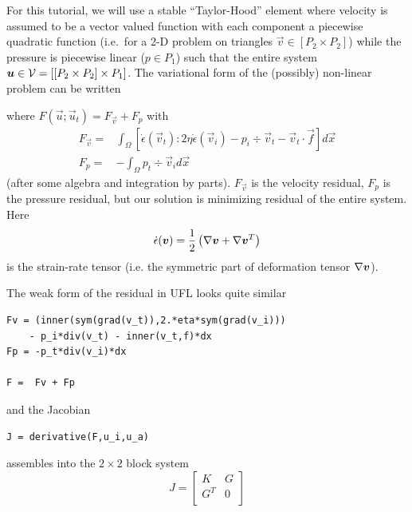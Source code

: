 For this tutorial, we will use a stable ``Taylor-Hood'' element where
velocity is assumed to be a vector valued function with each component
a piecewise quadratic function (i.e.\ for a 2-D problem on triangles
$\vec{v}\in [P_{2}\times P_{2}]$) while the pressure is piecewise
linear ($p\in P_{1}$) such that the entire system ${\mbox{\boldmath$u$}}\in \mathcal{V}
= [[P_{2}\times P_{2}]\times P_{1}]$.  The variational form of the
(possibly) non-linear problem can be written
\begin{quote}
\end{quote}
 where $F(\vec{u};\vec{u}_{t}) = F_{\vec{v}} + F_{p}$ with
\begin{align}
         F_{\vec{v}} =  & \int_\Omega \left[\dot{\epsilon}(\vec{v}_{t}):
             2\eta \dot{\epsilon}(\vec{v}_{i}) -
             p_{i}\div\vec{v}_t  - \vec{v}_{t} \cdot\vec{f} \right]d\vec{x}  \\
 F_{p} =& -\int_\Omega p_t\div\vec{v}_{i} d\vec{x}
\end{align}
(after some algebra and integration by parts). $F_{\vec{v}}$ is the
velocity residual, $F_{p}$ is the pressure residual, but our solution
is minimizing residual of the entire system.  Here
\begin{equation}
  \label{eq:19}
  \dot{\epsilon}({\mbox{\boldmath$v$}}) = \frac{1}{2}
  \left(
\nabla{\mbox{\boldmath$v$}} + \nabla{\mbox{\boldmath$v$}}^{T}
  \right)
\end{equation} is the strain-rate tensor (i.e. the symmetric part of
deformation tensor $\nabla{\mbox{\boldmath$v$}}$).   

The weak form of the residual in UFL looks quite similar
\begin{lstlisting}[style=UFL]
Fv = (inner(sym(grad(v_t)),2.*eta*sym(grad(v_i)))
    - p_i*div(v_t) - inner(v_t,f)*dx  
Fp = -p_t*div(v_i)*dx 

F =  Fv + Fp 
\end{lstlisting}
and the Jacobian
\begin{lstlisting}[style=UFL]
  J = derivative(F,u_i,u_a)
\end{lstlisting}
assembles into the $2\times2$ block system
\begin{equation}
  \label{eq:20}
  J =
  \left[
    \begin{array}{cc}
      K & G \\
      G^{T} & 0\\
    \end{array}
  \right]
\end{equation}

